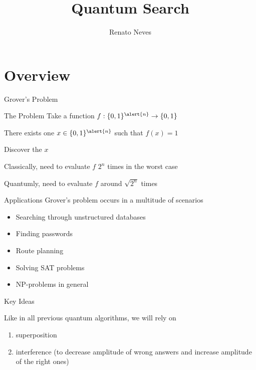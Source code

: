 \documentclass{beamer}
\author[Renato Neves]{Renato Neves}
\date{}
\begin{document}
\title{Quantum Search}

\frame[plain]{\titlepage}

\section{Overview}

\begin{frame}{Grover's Problem}

        \begin{block}{The Problem}
                Take a function $f : \{0,1\}^{\alert{n}} \to \{0,1\}$

        There exists one $x \in \{0,1\}^{\alert{n}}$ such that $f(x) = 1$ 

        Discover the $x$  
        \end{block}

        Classically, need to evaluate $f$ $2^n$ times in the worst case 
        \pause

        \pause
        Quantumly, need to evaluate $f$ around \alert{$\sqrt{2^n}$} times
\end{frame}

\begin{frame}{Applications}
        Grover's problem occurs in a multitude of scenarios
        \begin{itemize}
                \item Searching through unstructured databases
                \item Finding passwords
                \item Route planning
                \item Solving SAT problems
                \item \alert{NP}-problems in general
        \end{itemize}
\end{frame}

\begin{frame}{Key Ideas}

        Like in all previous quantum algorithms, we will rely on
        \begin{enumerate}
        \item superposition
        \item interference (to decrease amplitude of wrong
                answers and increase amplitude of the right ones)
        \end{enumerate}
\end{frame}
\end{document}
